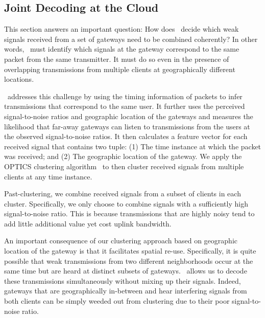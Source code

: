 


\subsection{Joint Decoding at the Cloud}
\label{sec:joint-decoding-cloud}
This section answers an important question: How does \name\ decide which weak signals received from a set of gateways need to be combined coherently? In other words, \name\ must identify which signals at the gateway correspond to the same packet from the same transmitter. It must do so even in the presence of overlapping transmissions from multiple clients at geographically different locations. \vspace*{0.1in}

 \name\ addresses this challenge by using the timing information of packets to infer transmissions that correspond to the same user. It further uses the perceived signal-to-noise ratios and geographic location of the gateways and measures the likelihood that far-away gateways can listen to transmissions from the users at the observed signal-to-noise ratios. It then calculates a feature vector for each received signal that contains two tuple: (1) The time instance at which the packet was received; and (2) The geographic location of the gateway. We apply the OPTICS clustering algorithm~\cite{} to then cluster received signals from multiple clients at any time instance. 

Past-clustering, we combine received signals from a subset of clients in each cluster. Specifically, we only choose to combine signals with a sufficiently high signal-to-noise ratio. This is because transmissions that are highly noisy tend to add little additional value yet cost uplink bandwidth. 

An important consequence of our clustering approach based on geographic location of the gateway is that it facilitates spatial re-use. Specifically, it is quite possible that weak transmissions from two different neighborhoods occur at the same time but are heard at distinct subsets of gateways. \name\ allows us to decode these transmissions simultaneously without mixing up their signals. Indeed, gateways that are geographically in-between and hear interfering signals from both clients can be simply weeded out from clustering due to their poor signal-to-noise ratio. 

